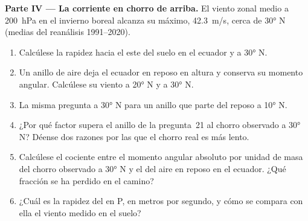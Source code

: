 \begin{problem}
\medskip
\noindent\textbf{Parte IV --- La corriente en chorro de arriba.} El viento zonal medio a \qty{200}{hPa} en el invierno boreal alcanza su máximo, \qty{42.3}{m/s}, cerca de \ang{30} N (medias del reanálisis 1991--2020).
\begin{enumerate}[resume]
  \item Calcúlese la rapidez hacia el este del suelo en el ecuador y a \ang{30} N.
  \item Un anillo de aire deja el ecuador en reposo en altura y conserva su momento angular. Calcúlese su viento a \ang{20} N y a \ang{30} N.
  \item La misma pregunta a \ang{30} N para un anillo que parte del reposo a \ang{10} N.
  \item ¿Por qué factor supera el anillo de la pregunta~21 al chorro observado a \ang{30} N? Déense dos razones por las que el chorro real es más lento.
  \item Calcúlese el cociente entre el momento angular absoluto por unidad de masa del chorro observado a \ang{30} N y el del aire en reposo en el ecuador. ¿Qué fracción se ha perdido en el camino?
  \item ¿Cuál es la rapidez del  en P, en metros por segundo, y cómo se compara con ella el viento medido en el suelo?
\end{enumerate}
\end{problem}
